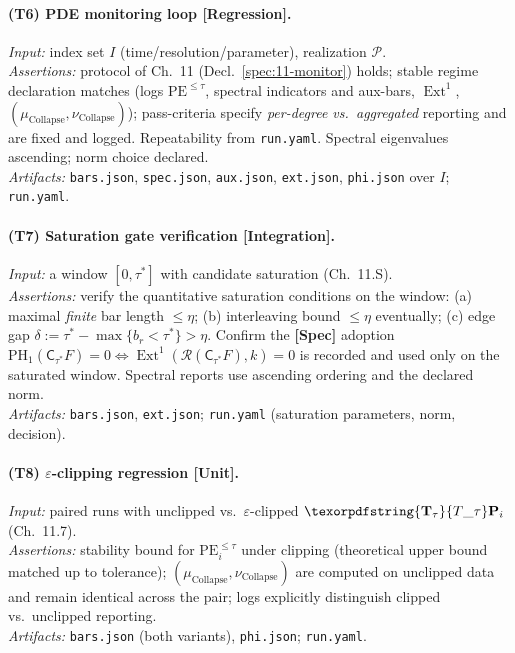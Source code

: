 \documentclass[11pt]{article}
\numberwithin{equation}{section}
\theoremstyle{plain}
\theoremstyle{definition}
\theoremstyle{remark}
\DeclareMathOperator{\Ext}{Ext}
\DeclareRobustCommand{\hyp}{\nobreakdash-}
\newcommand{\C}{\mathsf{C}}
\newcommand{\Rfun}{\mathcal{R}}
\theoremstyle{plain}
\theoremstyle{definition}
\numberwithin{equation}{section}
\theoremstyle{definition}
\DeclareRobustCommand{\Ttau}{\texorpdfstring{\ensuremath{\mathbf{T}_{\tau}}}{T\_\tau}}
\DeclareRobustCommand{\muc}{\mu_{\mathrm{Collapse}}}
\DeclareRobustCommand{\nuc}{\nu_{\mathrm{Collapse}}}
\numberwithin{equation}{section}
\theoremstyle{plain}
\theoremstyle{definition}
\theoremstyle{remark}
\providecommand{\Tfun}[1]{\mathbf{T}_{#1}}
\providecommand{\Ttau}{\Tfun{\tau}}
\providecommand{\muc}{\mu_{\mathrm{Collapse}}}
\providecommand{\nuc}{\nu_{\mathrm{Collapse}}}
\providecommand{\n}{\unskip\space}
\begin{document}
\paragraph{(T6) PDE monitoring loop [Regression].}
\emph{Input:} index set \(I\) (time/resolution/parameter), realization \(\mathcal{P}\).\\\n\emph{Assertions:} protocol of Ch.~11 (Decl.~\ref{spec:11-monitor}) holds; stable regime declaration matches (logs \(\mathrm{PE}^{\le\tau}\), spectral indicators and aux-bars, \(\Ext^1\), \((\muc,\nuc)\)); pass\hyp criteria specify \emph{per\hyp degree vs.\ aggregated} reporting and are fixed and logged. Repeatability from \texttt{run.yaml}. Spectral eigenvalues ascending; norm choice declared.\\\n\emph{Artifacts:} \texttt{bars.json}, \texttt{spec.json}, \texttt{aux.json}, \texttt{ext.json}, \texttt{phi.json} over \(I\); \texttt{run.yaml}.

\paragraph{(T7) Saturation gate verification [Integration].}
\emph{Input:} a window \([0,\tau^\ast]\) with candidate saturation (Ch.~11.S).\\\n\emph{Assertions:} verify the quantitative saturation conditions on the window: (a) maximal \emph{finite} bar length \(\le \eta\); (b) interleaving bound \(\le \eta\) eventually; (c) edge gap \(\delta:=\tau^\ast-\max\{b_r<\tau^\ast\}>\eta\). Confirm the \textbf{[Spec]} adoption \(\mathrm{PH}_1(\C_{\tau^\ast}F)=0 \Leftrightarrow \Ext^1(\Rfun(\C_{\tau^\ast}F),k)=0\) is recorded and used only on the saturated window. Spectral reports use ascending ordering and the declared norm.\\\n\emph{Artifacts:} \texttt{bars.json}, \texttt{ext.json}; \texttt{run.yaml} (saturation parameters, norm, decision).

\paragraph{(T8) \(\varepsilon\)\hyp clipping regression [Unit].}
\emph{Input:} paired runs with unclipped vs.\ \(\varepsilon\)\hyp clipped \(\Ttau\mathbf{P}_i\) (Ch.~11.7).\\\n\emph{Assertions:} stability bound for \(\mathrm{PE}^{\le\tau}_i\) under clipping (theoretical upper bound matched up to tolerance); \((\muc,\nuc)\) are computed on unclipped data and remain identical across the pair; logs explicitly distinguish clipped vs.\ unclipped reporting.\\\n\emph{Artifacts:} \texttt{bars.json} (both variants), \texttt{phi.json}; \texttt{run.yaml}.
\end{document}
